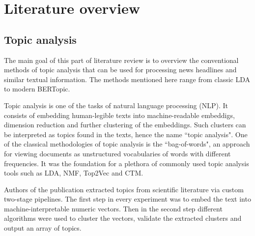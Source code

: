 \documentclass[3p,times,procedia]{elsarticle}
\begin{document}

\section{Literature overview}


\setlength{\belowdisplayskip}{12pt} \setlength{\belowdisplayshortskip}{7pt}
\setlength{\abovedisplayskip}{12pt} \setlength{\abovedisplayshortskip}{7pt}


\subsection{Topic analysis} \label{ta}

The main goal of this part of literature review is to overview the conventional methods of topic analysis that can be used for processing news headlines and similar textual information. The methods mentioned here range from classic LDA to modern BERTopic.

Topic analysis is one of the tasks of natural language processing (NLP). It consists of embedding human-legible texts into machine-readable embeddigs, dimension reduction and further clustering of the embeddings. Such clusters can be interpreted as topics found in the texts, hence the name ``topic analysis". One of the classical methodologies of topic analysis is the ``bag-of-words", an approach for viewing documents as unstructured vocabularies of words with different frequencies. It was the foundation for a plethora of commonly used topic analysis tools such as LDA, NMF, Top2Vec and CTM.

Authors of the publication \cite{onan2019two} extracted topics from scientific literature via custom two-stage pipelines. The first step in every experiment was to embed the text into machine-interpretable numeric vectors. Then in the second step different algorithms were used to cluster the vectors, validate the extracted clusters and output an array of topics.
\end{document}
